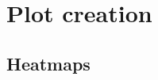 \section{Plot creation}
\label{sec:plot_creation}














\subsection{Heatmaps}
\label{sub:heatmaps}





































